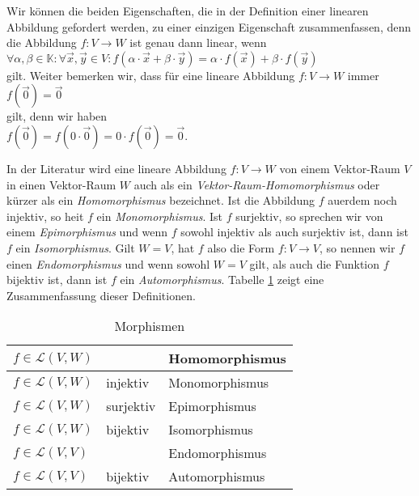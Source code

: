 \remark
Wir k\"{o}nnen die beiden Eigenschaften, die in der Definition einer linearen Abbildung gefordert werden, zu 
einer einzigen Eigenschaft zusammenfassen, denn die Abbildung $f:V \rightarrow W$ ist genau dann linear, wenn
\\[0.2cm]
\hspace*{1.3cm}
$\forall \alpha, \beta \in \mathbb{K}: \forall \vec{x}, \vec{y} \in V: f(\alpha \cdot \vec{x} + \beta \cdot \vec{y}) = \alpha \cdot f(\vec{x}) + \beta \cdot f(\vec{y})$
\\[0.2cm]
gilt.  Weiter bemerken wir, dass f\"{u}r eine lineare Abbildung $f:V \rightarrow W$ immer
\\[0.2cm]
\hspace*{1.3cm}
$f(\vec{0}) = \vec{0}$
\\[0.2cm]
gilt, denn wir haben
\\[0.2cm]
\hspace*{1.3cm}
$f(\vec{0}) = f(0 \cdot \vec{0}) = 0 \cdot f(\vec{0}) = \vec{0}$.
\eoxs

\remark
In der Literatur wird eine lineare Abbildung $f:V \rightarrow W$ von einem Vektor-Raum $V$ in einen
Vektor-Raum $W$ auch als ein {\emph{\color{blue}Vektor-Raum-Homomorphismus}} oder k\"{u}rzer als ein
{\emph{\color{blue}Homomorphismus}} bezeichnet.  Ist die Abbildung $f$ au\3erdem noch injektiv, so hei\3t $f$ ein
{\emph{\color{blue}Monomorphismus}}.  Ist $f$ surjektiv, so sprechen wir von einem {\emph{\color{blue}Epimorphismus}} und wenn
$f$ sowohl injektiv als auch surjektiv ist, dann ist $f$ ein {\emph{\color{blue}Isomorphismus}}.  Gilt $W = V$,
hat $f$ also die Form $f: V \rightarrow V$, so nennen wir $f$ einen {\emph{\color{blue}Endomorphismus}} und wenn
sowohl $W=V$ gilt, als auch die Funktion $f$ bijektiv ist, dann ist $f$ ein {\emph{\color{blue}Automorphismus}}. 
Tabelle \ref{tab:morphism} zeigt eine Zusammenfassung dieser Definitionen.


\begin{table}[h]
  \centering
  \begin{tabular}{||l|l|l||}
    \hline
    \hline
   $f \in \mathcal{L}(V,W)$ &           & Homomorphismus \\ 
    \hline
   $f \in \mathcal{L}(V,W)$ & injektiv  & Monomorphismus \\ 
    \hline
   $f \in \mathcal{L}(V,W)$ & surjektiv & Epimorphismus \\ 
    \hline
   $f \in \mathcal{L}(V,W)$ & bijektiv  & Isomorphismus \\ 
    \hline
   $f \in \mathcal{L}(V,V)$ &           & Endomorphismus \\ 
    \hline
   $f \in \mathcal{L}(V,V)$ & bijektiv  & Automorphismus \\ 
    \hline
    \hline
  \end{tabular}
  \caption{Morphismen}
  \label{tab:morphism}
\end{table}

